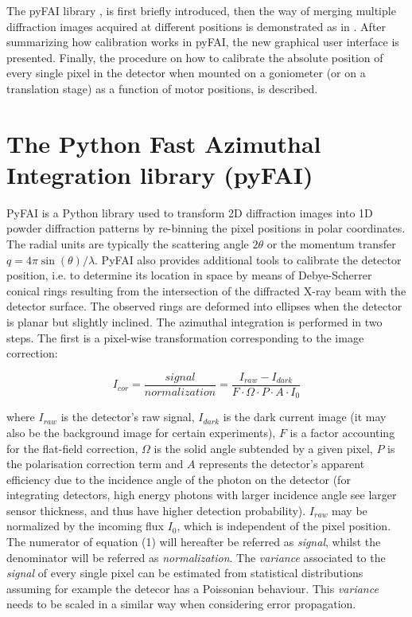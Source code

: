 \documentclass[preprint]{iucr}              %
\begin{document}
The pyFAI library \cite{fv5028}, is first briefly introduced, 
then the way of merging multiple diffraction images
acquired at different positions is demonstrated as in \cite{PyFAI_PDJ}. 
After summarizing how calibration works in pyFAI, the new graphical user
interface is presented.
Finally, the procedure on how to calibrate the absolute position of
every single pixel in the detector when mounted on a goniometer (or on a
translation stage) as a function of motor positions, is
described.

\section{The Python Fast Azimuthal Integration library (pyFAI)}

PyFAI is a Python \cite{python} library used to transform 2D diffraction images into
1D powder diffraction patterns by re-binning the pixel positions in polar
coordinates. 
The radial units are typically the scattering angle  
$2\theta$ or the momentum transfer $q=4\pi \sin(\theta)/\lambda$.
PyFAI also provides additional tools to calibrate the detector position, i.e.
to determine its location in space by means of Debye-Scherrer conical rings
resulting from the intersection of the diffracted X-ray beam with the
detector surface. 
The observed rings are deformed into ellipses when the detector is planar but 
slightly inclined. 
The azimuthal integration is performed in two steps. 
The first is a pixel-wise
transformation corresponding to the image correction:

\begin{equation}
I_{cor} = \frac{signal}{normalization}  = \frac{I_{raw} - I_{dark}}{F \cdot
\Omega \cdot P \cdot A \cdot I_0} 
\end{equation}

where $I_{raw}$ is the detector's raw signal, $I_{dark}$ is the dark current
image (it may also be the background image for certain experiments), $F$ is a 
factor accounting for the flat-field correction, $\Omega$ is the solid
angle subtended by a given pixel, $P$ is the polarisation correction term and
$A$ represents the detector's apparent efficiency due to the incidence angle of the
photon on the detector (for integrating detectors, high energy photons with
larger incidence angle see larger sensor thickness, and thus have higher
detection probability).
$I_{raw}$ may be normalized by the incoming flux $I_0$, which is
independent of the pixel position.
The numerator of equation (1) will hereafter be referred as
\textit{signal}, whilst the denominator will be referred as
\textit{normalization}. 
The \textit{variance} associated to the \textit{signal} of every single pixel can be estimated 
from statistical distributions assuming for example the detecor has a Poissonian behaviour. 
This \textit{variance} needs to be scaled in a similar way when considering error propagation.
\end{document}
